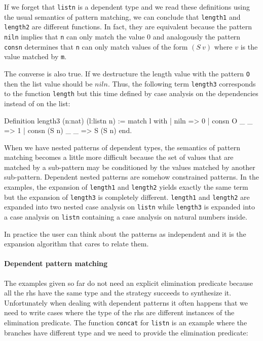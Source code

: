 If we forget that \texttt{listn} is a dependent type and we read these
definitions using the usual semantics of pattern matching,  we can conclude
that \texttt{length1}
and \texttt{length2} are different functions.
In fact, they are equivalent
because the pattern \texttt{niln} implies that \texttt{n} can only match
the value $0$ and analogously the pattern \texttt{consn} determines that \texttt{n} can
only match  values of the form  $(S~v)$ where $v$ is the value matched by
\texttt{m}. 

The converse is also true. If
we destructure the  length  value with the pattern \texttt{O} then the list
value should be $niln$. 
Thus, the following term \texttt{length3} corresponds to the function
\texttt{length} but this time defined by case analysis on the dependencies instead of on the list:

\begin{coq_example}
Definition length3 (n:nat) (l:listn n) :=
  match l with
  | niln => 0
  | consn O _ _ => 1
  | consn (S n) _ _ => S (S n)
  end.
\end{coq_example}

When we have nested patterns of dependent types, the semantics of
pattern matching becomes a little more difficult because
the set of values that are matched by a sub-pattern may be conditioned by the
values matched by another sub-pattern. Dependent nested patterns are
somehow constrained patterns. 
In the examples, the expansion of
\texttt{length1} and \texttt{length2} yields exactly the same term
 but the
expansion of \texttt{length3} is completely different. \texttt{length1} and
\texttt{length2} are expanded into two nested case analysis on
\texttt{listn} while \texttt{length3} is expanded into a case analysis on
\texttt{listn} containing a case analysis on natural numbers inside.


In practice the user can think about the patterns as independent and
it is the expansion algorithm that cares to relate them. \\
\fi
%
%
%

\paragraph{Dependent pattern matching}
The examples  given so far do not need an explicit elimination predicate
 because all the rhs have the same type and the
strategy succeeds to synthesize it.
Unfortunately when dealing with dependent patterns it often happens
that we need to write cases where the type of the rhs are 
different  instances of the elimination  predicate.
The function  \texttt{concat} for \texttt{listn}
is an example where the branches have different type
and we need to provide the elimination predicate:

